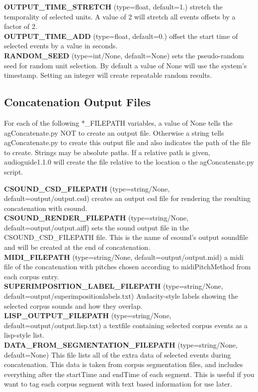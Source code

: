 \documentclass{article}
\newcommand{\optEntry}[4]{\textbf{#1} (type=#2, default=#3) #4\hspace{0.5em}\\}
\newcommand{\ag}{audioguide1.1.0\xspace}
\begin{document}
\begin{spacing}{1.2}
\optEntry{OUTPUT\_TIME\_STRETCH}{float}{1.}{stretch the temporality of selected units.  A value of 2 will stretch all events offsets by a factor of 2.}

\optEntry{OUTPUT\_TIME\_ADD}{float}{0.}{offset the start time of selected events by a value in seconds.}

\optEntry{RANDOM\_SEED}{int/None}{None}{sets the pseudo-random seed for random unit selection.  By default a value of None will use the system's timestamp.  Setting an integer will create repeatable random results.}


\subsection{Concatenation Output Files}\label{outputfiles}
For each of the following *\_FILEPATH variables, a value of None tells the agConcatenate.py NOT to create an output file.  Otherwise a string tells agConcatenate.py to create this output file and also indicates the path of the file to create.  Strings may be absolute paths.  If a relative path is given, \ag will create the file relative to the location o the agConcatenate.py script.

\optEntry{CSOUND\_CSD\_FILEPATH}{string/None}{output/output.csd}{creates an output csd file for rendering the resulting concatenation with csound.}

\optEntry{CSOUND\_RENDER\_FILEPATH}{string/None}{output/output.aiff}{sets the sound output file in the CSOUND\_CSD\_FILEPATH file.  This is the name of csound's output soundfile and will be created at the end of concatenation.}

\optEntry{MIDI\_FILEPATH}{string/None}{output/output.mid}{a midi file of the concatenation with pitches chosen according to midiPitchMethod from each corpus entry.}

\optEntry{SUPERIMPOSITION\_LABEL\_FILEPATH}{string/None}{output/superimpositionlabels.txt}{Audacity-style labels showing the selected corpus sounds and how they overlap.}

\optEntry{LISP\_OUTPUT\_FILEPATH}{string/None}{output/output.lisp.txt}{a textfile containing selected corpus events as a lisp-style list.}

\optEntry{DATA\_FROM\_SEGMENTATION\_FILEPATH}{string/None}{None}{This file lists all of the extra data of selected events during concatenation.  This data is taken from corpus segmentation files, and includes everything after the startTime and endTime of each segment.  This is useful if you want to tag each corpus segment with text based information for use later.}


\end{spacing}
\end{document}
